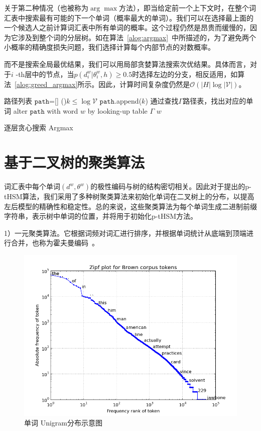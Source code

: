 关于第二种情况（也被称为$\arg\max $方法），即当给定前一个上下文时，在整个词汇表中搜索最有可能的下一个单词（概率最大的单词）。我们可以在选择最上面的一个候选人之前计算词汇表中所有单词的概率。这个过程仍然是昂贵而缓慢的，因为它涉及到整个词的分层树。如在算法~\ref{alog:argmax}~中所描述的，为了避免两个小概率的精确度损失问题，我们选择计算每个内部节点的对数概率。

而不是搜索全局最优结果，我们可以用局部贪婪算法搜索次优结果。具体而言，对于$ i $ -th层中的节点，当$ p(d ^ w_i | \theta_{i} ^ w,h)\ge 0.5 $时选择左边的分支，相反适用，如算法~\ref{alog:greed_argmax}所示。因此，计算时间复杂度仍然是$ \mathcal{O}(| H | \log \mathcal {| V |})$。


\begin{algorithm}[!ht]
\SetAlgoLined
{}
 路径列表 $\mathtt{path}$=[] \;
\While(){$k \le \log \mathcal{V}$ }{
 $\mathtt{path}$.append($k$) 
}
{通过查找$\Gamma$路径表，找出对应的单词}\;
 alter $\mathtt{path}$ with word $w$ by looking-up table $\Gamma$\;
 \Return $w$ \;
\caption{逐层贪心搜索 Argmax}\label{alog:greed_argmax}
\end{algorithm}

\section{基于二叉树的聚类算法}
词汇表中每个单词$(d^w,\theta^w)$的极性编码与树的结构密切相关。因此对于提出的p-tHSM算法，我们采用了多种树聚类算法来初始化单词在二叉树上的分布，以提高左后模型的精确性和稳定性。总的来说，这些聚类算法为每个单词生成二进制前缀字符串，表示树中单词的位置，并将用于初始化p-tHSM方法。


1）一元聚类算法。它根据词频对词汇进行排序，并根据单词统计从底端到顶端进行合并，也称为霍夫曼编码~。

\begin{figure}[!ht]
  \centering
\includegraphics[width=0.6\linewidth]{./figures/zipf.png}
\caption{单词 Unigram分布示意图}\label{fig:zipf}
\end{figure}

